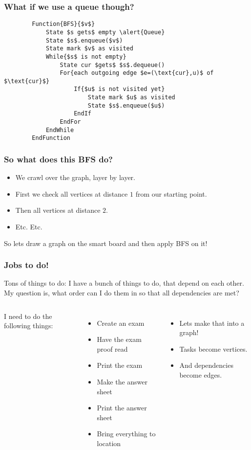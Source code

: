 \begin{frame}[fragile]
	\frametitle{What if we use a queue though?}
	
	
	\begin{lstlisting}
		Function{BFS}{$v$}
			State $s gets$ empty \alert{Queue}
			State $s$.enqueue($v$)
			State mark $v$ as visited
			While{$s$ is not empty}
				State cur $gets$ $s$.dequeue()
				For{each outgoing edge $e=(\text{cur},u)$ of $\text{cur}$}
					If{$u$ is not visited yet}
						State mark $u$ as visited
						State $s$.enqueue($u$)
					EndIf
				EndFor
			EndWhile
		EndFunction
	\end{lstlisting}
\end{frame}

\begin{frame}[fragile]
	\frametitle{So what does this BFS do?}

		\begin{itemize}
		\item We crawl over the graph, layer by layer.
		\item First we check all vertices at distance $1$ from our starting point.
		\item Then all vertices at distance $2$.
		\item Etc. Etc.
		\end{itemize}	
		So lets draw a graph on the smart board and then apply BFS on it!
\end{frame}


\begin{frame}
	\frametitle{Jobs to do!}

Tons of things to do: 	I have a bunch of things to do, that depend on each other. My question is, what order can I do them in so that all
		dependencies are met?
	
	\begin{columns}[T]
			I need to do the following things:
			\begin{itemize}
				\item Create an exam
		
				\item Have the exam proof read
				\item Print the exam
		
				\item Make the answer sheet
				\item Print the answer sheet
		
				\item Bring everything to location
			\end{itemize}
			\begin{itemize}
				\item Lets make that into a graph!
				\item Tasks become vertices.
				\item And dependencies become edges.
			\end{itemize}	
	\end{columns}
\end{frame}

